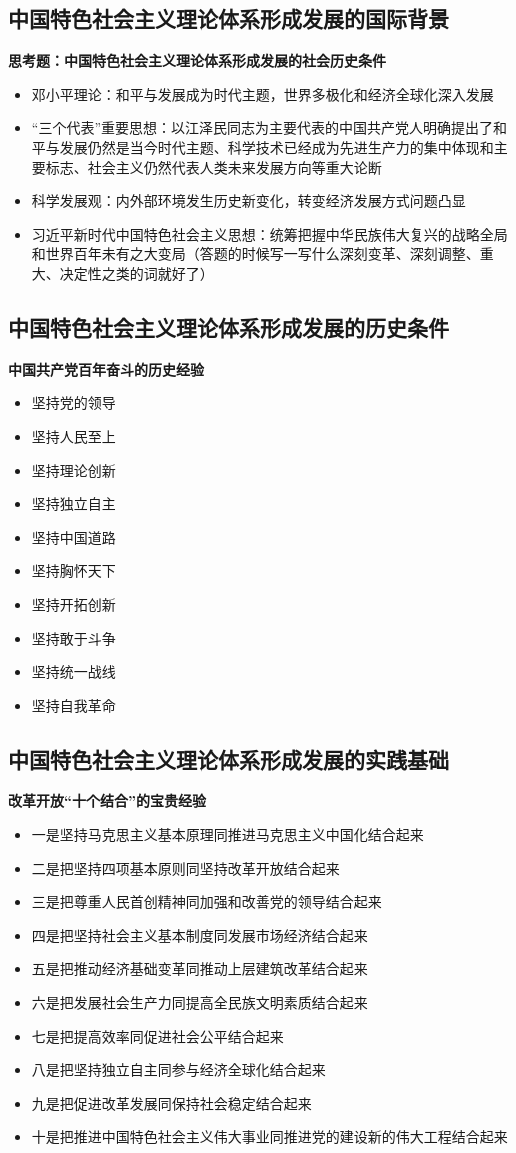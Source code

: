 \documentclass[12pt,openany]{ctexbook}
\begin{document}
\subsection{中国特色社会主义理论体系形成发展的国际背景}
\textbf{思考题：中国特色社会主义理论体系形成发展的社会历史条件}
\begin{itemize}
  \item 邓小平理论：和平与发展成为时代主题，世界多极化和经济全球化深入发展
  \item “三个代表”重要思想：以江泽民同志为主要代表的中国共产党人明确提出了和平与发展仍然是当今时代主题、科学技术已经成为先进生产力的集中体现和主要标志、社会主义仍然代表人类未来发展方向等重大论断
  \item 科学发展观：内外部环境发生历史新变化，转变经济发展方式问题凸显
  \item 习近平新时代中国特色社会主义思想：统筹把握中华民族伟大复兴的战略全局和世界百年未有之大变局（答题的时候写一写什么深刻变革、深刻调整、重大、决定性之类的词就好了）
\end{itemize}
\subsection{中国特色社会主义理论体系形成发展的历史条件}
\textbf{中国共产党百年奋斗的历史经验}
\begin{itemize}
  \item 坚持党的领导
  \item 坚持人民至上
  \item 坚持理论创新
  \item 坚持独立自主
  \item 坚持中国道路
  \item 坚持胸怀天下
  \item 坚持开拓创新
  \item 坚持敢于斗争
  \item 坚持统一战线
  \item 坚持自我革命
\end{itemize}
\subsection{中国特色社会主义理论体系形成发展的实践基础}
\textbf{改革开放“十个结合”的宝贵经验}
\begin{itemize}
  \item 一是坚持马克思主义基本原理同推进马克思主义中国化结合起来
  \item 二是把坚持四项基本原则同坚持改革开放结合起来
  \item 三是把尊重人民首创精神同加强和改善党的领导结合起来
  \item 四是把坚持社会主义基本制度同发展市场经济结合起来
  \item 五是把推动经济基础变革同推动上层建筑改革结合起来
  \item 六是把发展社会生产力同提高全民族文明素质结合起来
  \item 七是把提高效率同促进社会公平结合起来
  \item 八是把坚持独立自主同参与经济全球化结合起来
  \item 九是把促进改革发展同保持社会稳定结合起来
  \item 十是把推进中国特色社会主义伟大事业同推进党的建设新的伟大工程结合起来
\end{itemize}
\end{document}
